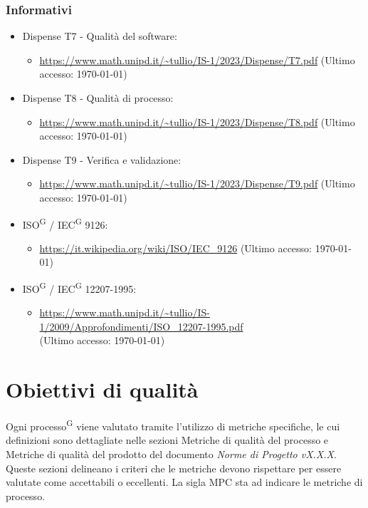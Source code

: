\documentclass[8pt]{article}
\newcommand{\glossterm}[1]{#1\textsuperscript{G}} %
\begin{document}
\subsubsection{Informativi}
\begin{itemize}
	\item Dispense T7 - Qualità del software:
	\begin{itemize}
		\item \href{https://www.math.unipd.it/~tullio/IS-1/2023/Dispense/T7.pdf}{\color{myblue}https://www.math.unipd.it/\textasciitilde{}tullio/IS-1/2023/Dispense/T7.pdf} (Ultimo accesso: \today)
	\end{itemize}
	\item Dispense T8 - Qualità di processo:
	\begin{itemize}
		\item \href{https://www.math.unipd.it/~tullio/IS-1/2023/Dispense/T8.pdf}{\color{myblue}https://www.math.unipd.it/\textasciitilde{}tullio/IS-1/2023/Dispense/T8.pdf} (Ultimo accesso: \today)
	\end{itemize}
	\item Dispense T9 - Verifica e validazione:
	\begin{itemize}
		\item \href{https://www.math.unipd.it/~tullio/IS-1/2023/Dispense/T9.pdf}{\color{myblue}https://www.math.unipd.it/\textasciitilde{}tullio/IS-1/2023/Dispense/T9.pdf} (Ultimo accesso: \today)
	\end{itemize}
	\item \glossterm{ISO} / \glossterm{IEC} 9126:
	\begin{itemize}
		\item \href{https://it.wikipedia.org/wiki/ISO/IEC_9126}{\color{myblue}https://it.wikipedia.org/wiki/ISO/IEC\_9126} (Ultimo accesso: \today)
	\end{itemize}
	\item \glossterm{ISO} / \glossterm{IEC} 12207-1995:
	\begin{itemize}
		\item \href{https://www.math.unipd.it/~tullio/IS-1/2009/Approfondimenti/ISO_12207-1995.pdf}{\color{myblue}https://www.math.unipd.it/\textasciitilde{}tullio/IS-1/2009/Approfondimenti/ISO\_12207-1995.pdf} \\ (Ultimo accesso: \today)
	\end{itemize}
\end{itemize}
\clearpage
\section{Obiettivi di qualità}
Ogni \glossterm{processo} viene valutato tramite l'utilizzo di metriche specifiche, le cui definizioni sono dettagliate nelle sezioni Metriche di qualità del processo e Metriche di qualità del prodotto del documento \textit{Norme di Progetto vX.X.X}. Queste sezioni delineano i criteri che le metriche devono rispettare per essere valutate come accettabili o eccellenti. La sigla MPC sta ad indicare le metriche di processo.
\end{document}
